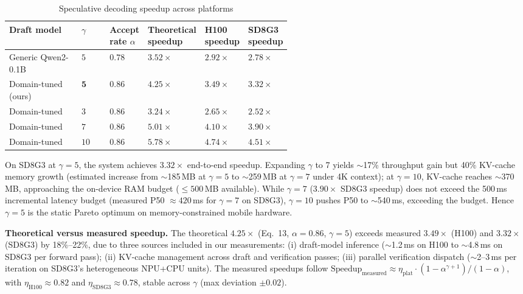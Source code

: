 \documentclass[11pt, a4paper]{article}
\begin{document}
\begin{table}[htbp]
\centering
\caption{Speculative decoding speedup across platforms}
\label{tab:speculative_decoding-en}
\small
\renewcommand{\arraystretch}{1.2}
\begin{tabular}{l>{\centering\arraybackslash}p{0.1\linewidth}>{\centering\arraybackslash}p{0.13\linewidth}>{\centering\arraybackslash}p{0.11\linewidth}>{\centering\arraybackslash}p{0.1\linewidth}>{\centering\arraybackslash}p{0.1\linewidth}}
\toprule
\textbf{Draft model} & \textbf{$\gamma$} & \textbf{Accept rate $\alpha$} & \textbf{Theoretical speedup} & \textbf{H100 speedup} & \textbf{SD8G3 speedup} \\
\midrule
Generic Qwen2-0.1B & $5$ & $0.78$ & $3.52\times$ & $2.92\times$ & $2.78\times$ \\
Domain-tuned (ours) & $\mathbf{5}$ & $\mathbf{0.86}$ & $\mathbf{4.25\times}$ & $\mathbf{3.49\times}$ & $\mathbf{3.32\times}$ \\
Domain-tuned & $3$ & $0.86$ & $3.24\times$ & $2.65\times$ & $2.52\times$ \\
Domain-tuned & $7$ & $0.86$ & $5.01\times$ & $4.10\times$ & $3.90\times$ \\
Domain-tuned & $10$ & $0.86$ & $5.78\times$ & $4.74\times$ & $4.51\times$ \\
\bottomrule
\end{tabular}
\end{table}

On SD8G3 at $\gamma = 5$, the system achieves $3.32\times$ end-to-end speedup. Expanding $\gamma$ to 7 yields $\sim$17\% throughput gain but 40\% KV-cache memory growth (estimated increase from $\sim$185\,MB at $\gamma=5$ to $\sim$259\,MB at $\gamma=7$ under 4K context); at $\gamma=10$, KV-cache reaches $\sim$370\,MB, approaching the on-device RAM budget ($\le 500$\,MB available). While $\gamma=7$ ($3.90\times$ SD8G3 speedup) does not exceed the 500\,ms incremental latency budget (measured P50 $\approx 420$\,ms for $\gamma=7$ on SD8G3), $\gamma=10$ pushes P50 to $\sim$540\,ms, exceeding the budget. Hence $\gamma = 5$ is the static Pareto optimum on memory-constrained mobile hardware.

\medskip
\noindent\textbf{Theoretical versus measured speedup.} The theoretical $4.25\times$ (Eq.~13, $\alpha=0.86$, $\gamma=5$) exceeds measured $3.49\times$ (H100) and $3.32\times$ (SD8G3) by 18\%--22\%, due to three sources included in our measurements: (i) draft-model inference ($\sim$1.2\,ms on H100 to $\sim$4.8\,ms on SD8G3 per forward pass); (ii) KV-cache management across draft and verification passes; (iii) parallel verification dispatch ($\sim$2--3\,ms per iteration on SD8G3's heterogeneous NPU+CPU units). The measured speedups follow $\text{Speedup}_{\text{measured}} \approx \eta_{\text{plat}}\cdot (1-\alpha^{\gamma+1})/(1-\alpha)$, with $\eta_{\text{H100}} \approx 0.82$ and $\eta_{\text{SD8G3}} \approx 0.78$, stable across $\gamma$ (max deviation $\pm 0.02$).
\end{document}
